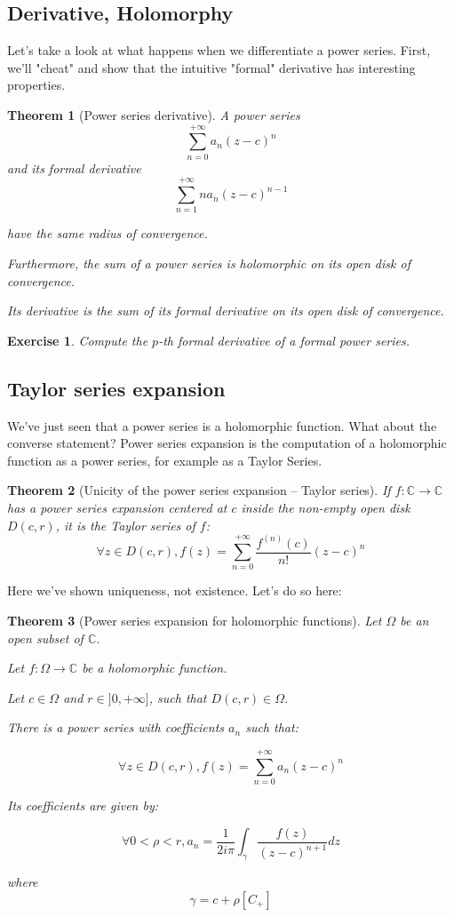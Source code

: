\documentclass{article}
\newtheorem{exo}{Exercise}
\newtheorem*{thm*}{Theorem}
\begin{document}
\subsection{Derivative, Holomorphy}

Let's take a look at what happens when we differentiate a power series. First, we'll "cheat" and show that the intuitive "formal" derivative has interesting properties.
\begin{thm*}
    [Power series derivative]
    A power series 
$$\sum_{n=0}^{+\infty}a_n(z-c)^n$$
and its formal derivative 
$$\sum_{n=1}^{+\infty}na_n(z-c)^{n-1}$$

have the same radius of convergence.

Furthermore, the sum of a power series is holomorphic on its open disk of convergence.

Its derivative is the sum of its formal derivative on its open disk of convergence.

\end{thm*}

\begin{exo}
    Compute the $p$-th formal derivative of a formal power series.
\end{exo}

\subsection{Taylor series expansion}
We've just seen that a power series is a holomorphic function. What about the converse statement? Power series expansion is the computation of a holomorphic function as a power series, for example as a Taylor Series.


\begin{thm*}[Unicity of the power series expansion -- Taylor series]
    If $f : \mathbb{C} \rightarrow \mathbb{C}$ has a power series expansion centered at $c$ inside the non-empty open disk $D(c,r)$, it is the Taylor series of $f$:
    $$\forall z \in D(c,r), f(z) = \sum_{n=0}^{+\infty}\frac{f^{(n)}(c)}{n!}(z-c)^n$$
\end{thm*}

Here we've shown uniqueness, not existence. Let's do so here:

\begin{thm*}
    [Power series expansion for holomorphic functions]
    Let $\Omega$ be an open subset of $\mathbb{C}$.

    Let $f: \Omega \rightarrow \mathbb{C}$ be a holomorphic function.
    
    Let $c\in\Omega$ and $r\in]0, +\infty]$, such that $D(c,r)\in\Omega$.

    There is a power series with coefficients $a_n$ such that:

    $$ \forall z \in D(c, r), f(z) = \sum_{n=0}^{+\infty}a_n(z-c)^n$$

Its coefficients are given by:

$$ \forall 0 < \rho < r, 
a_n = \frac{1}{2i\pi} \int_\gamma \frac{f(z)}{{(z-c)^{n+1}}}dz$$

where 
$$ \gamma = c + \rho[C_+]$$
\end{thm*}
\end{document}
